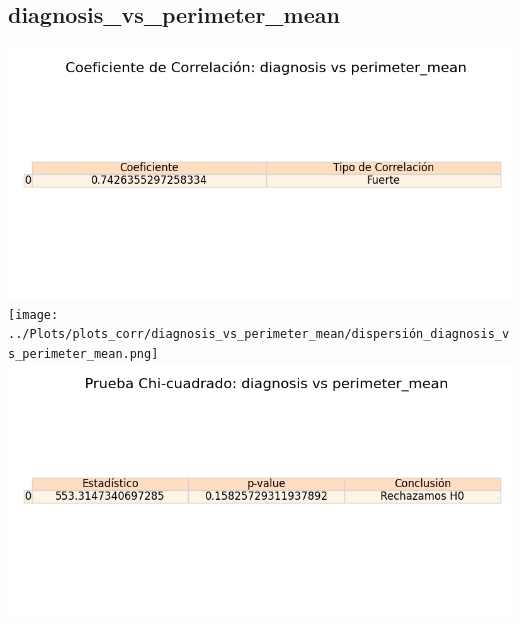 \documentclass[a4paper, 12pt]{article}
\begin{document}
\subsection{diagnosis\_vs\_perimeter\_mean}
    \includegraphics[width = \textwidth]{../Plots/plots_corr/diagnosis_vs_perimeter_mean/coeficiente_correlacion_diagnosis_vs_perimeter_mean.png}
    \texttt{[image: ../Plots/plots\_corr/diagnosis\_vs\_perimeter\_mean/dispersión\_diagnosis\_vs\_perimeter\_mean.png]}
    \includegraphics[width = \textwidth]{../Plots/plots_corr/diagnosis_vs_perimeter_mean/chi_cuadrado_diagnosis_vs_perimeter_mean.png}
\end{document}
